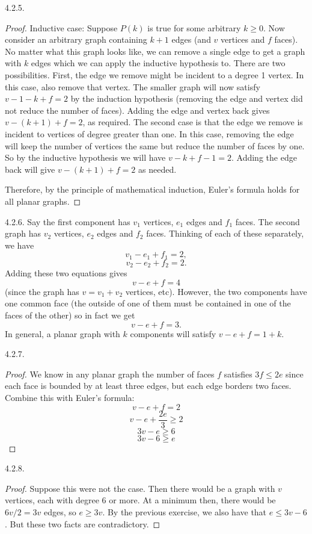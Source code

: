 \begin {itemize}
\begin{ans}{4.2.5.}
\begin{proof}
			Inductive case:  Suppose $P(k)$ is true for some arbitrary $k \ge 0$.  Now consider an arbitrary graph containing $k+1$ edges (and $v$ vertices and $f$ faces).  No matter what this graph looks like, we can remove a single edge to get a graph with $k$ edges which we can apply the inductive hypothesis to.  There are two possibilities.  First, the edge we remove might be incident to a degree 1 vertex.  In this case, also remove that vertex.  The smaller graph will now satisfy $v-1 - k + f = 2$ by the induction hypothesis (removing the edge and vertex did not reduce the number of faces).  Adding the edge and vertex back gives $v - (k+1) + f = 2$, as required.  The second case is that the edge we remove is incident to vertices of degree greater than one.  In this case, removing the edge will keep the number of vertices the same but reduce the number of faces by one.  So by the inductive hypothesis we will have $v - k + f-1 = 2$.  Adding the edge back will give $v - (k+1) + f = 2$ as needed.

			Therefore, by the principle of mathematical induction, Euler's formula holds for all planar graphs.
		\end{proof}
	
\end{ans}
\begin{ans}{4.2.6.}
		Say the first component has $v_1$ vertices, $e_1$ edges and $f_1$ faces.  The second graph has $v_2$ vertices, $e_2$ edges and $f_2$ faces.  Thinking of each of these separately, we have
		\[v_1 - e_1 + f_1 = 2,\]
		\[v_2 - e_2 + f_2 = 2.\]
		Adding these two equations gives
		\[v - e + f = 4\]
		(since the graph has $v = v_1 + v_2$ vertices, etc).  However, the two components have one common face (the outside of one of them must be contained in one of the faces of the other) so in fact we get
		\[v - e + f = 3.\]
		In general, a planar graph with $k$ components will satisfy $v - e + f = 1 + k$.
	
\end{ans}
\begin{ans}{4.2.7.}
		\begin{proof}
		We know in any planar graph the number of faces $f$ satisfies $3f \le 2e$ since each face is bounded by at least three edges, but each edge borders two faces.  Combine this with Euler's formula:
				\[v - e + f = 2\]
				\[v - e + \frac{2e}{3} \ge 2\]
				\[3v - e \ge 6\]
				\[3v - 6 \ge e\]
		\end{proof}

	
\end{ans}
\begin{ans}{4.2.8.}
		\begin{proof}
		 Suppose this were not the case.  Then there would be a graph with $v$ vertices, each with degree 6 or more.  At a minimum then, there would be $6v/2 = 3v$ edges, so $e \ge 3v$.  By the previous exercise, we also have that $e \le 3v - 6$.  But these two facts are contradictory.
		 \end{proof}
	
\end{ans}
\protect \end {itemize}
